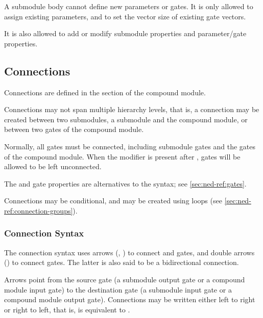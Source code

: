 {A submodule body cannot define new parameters or gates. It is only
allowed to assign existing parameters, and to set the vector
size of existing gate vectors.

It is also allowed to add or modify submodule properties and
parameter/gate properties.



\subsection{Connections}
\label{sec:ned-ref:connections}

Connections are defined in the  section of the compound module.

Connections may not span multiple hierarchy levels, that is, a connection
may be created between two submodules, a submodule and the compound module,
or between two gates of the compound module.

Normally, all gates must be connected, including submodule gates and the gates
of the compound module. When the  modifier is present
after , gates will be allowed to be left unconnected.

\begin{note}
    The  and  gate properties are alternatives to the
     syntax; see \ref{sec:ned-ref:gates}.
\end{note}

Connections may be conditional, and may be created using loops (see
\ref{sec:ned-ref:connection-groups}).


\subsubsection{Connection Syntax}
\label{sec:ned-ref:connection-syntax}

The connection syntax uses arrows (\ttt{-{}->}, \ttt{<-{}-}) to connect
 and  gates, and double arrows
(\ttt{<-{}->}) to connect  gates. The latter is
also said to be a bidirectional connection.

Arrows point from the source gate (a submodule output gate or a compound
module input gate) to the destination gate (a submodule input gate or a
compound module output gate). Connections may be written either left to right
or right to left, that is,  is equivalent to .

}
